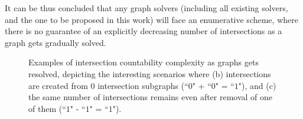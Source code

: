 \documentclass[journal]{IEEEtran}
\begin{document}
It can be thus concluded that any graph solvers (including all existing solvers, and the one to be proposed in this work) will face an enumerative scheme, where there is no guarantee of an explicitly decreasing number of intersections as a graph gets gradually solved. 


\begin{figure}[t]
\centering
{}
\caption{Examples of intersection countability complexity as graphs gets resolved, depicting the interesting scenarios where (b) intersections are created from 0 intersection subgraphs (``$0$" + ``$0$" = ``$1$"), and (c) the same number of intersections remains even after removal of one of them (``$1$" - ``$1$" = ``$1$").%
} %
\label{fig:add}
\end{figure}
\end{document}
